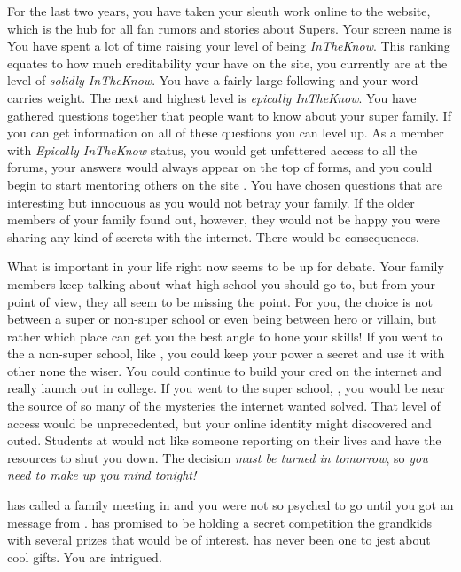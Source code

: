 \documentclass[char]{LRSguildcamp1}
\begin{document}
For the last two years, you have taken your sleuth work online to the \pTweenwebsite{} website, which is the hub for all fan rumors and stories about Supers. Your screen name is  You have spent a lot of time raising your level of being \textsl{InTheKnow}. This ranking equates to how much creditability your have on the site, you currently are at the level of \textsl{solidly InTheKnow}. You have a fairly large following and your word carries weight. The next and highest level is \textsl{epically InTheKnow}. You have gathered questions together that people want to know about your super family. If you can get information on all of these questions you can level up. As a member with \textit{Epically InTheKnow} status, you would get unfettered access to all the forums, your answers would always appear on the top of forms, and you could begin to start mentoring others on the site \pTweenwebsite{}. You have chosen questions that are interesting but innocuous as you would not betray your family. If the older members of your family found out, however, they would not be happy you were sharing any kind of secrets with the internet. There would be consequences. 

What is important in your life right now seems to be up for debate. Your family members keep talking about what high school you should go to, but from your point of view, they all seem to be missing the point. For you, the choice is not between a super or non-super school or even being  between hero or villain, but rather which place can get you the best angle to hone your skills! If you went to the a non-super school, like \pNormalSchool{}, you could keep your power a secret and use it with other none the wiser. You could continue to build your cred on the internet and really launch out in college. If you went to the super school, \pSuperSchool{}, you would be near the source of so many of the mysteries the internet wanted solved. That level of access would be unprecedented, but your online identity might discovered and outed. Students at \pSuperSchool{} would not like someone reporting on their lives and have the resources to shut you down. 
The decision \textsl{must be turned in tomorrow}, so \textit{you need to make up you mind tonight!}

\cGrandma{} has called a family meeting in \pCityGrandma{} and you were not so psyched to go until you got an message from \cGrandma{}. \cGrandma{\they} has promised to be holding a secret competition the grandkids with several prizes that would be of interest. \cGrandma{} has never been one to jest about cool gifts. You are intrigued.  
\end{document}
